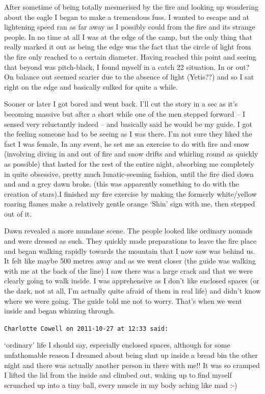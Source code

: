 \begin{footnotesize}
\begin{sffamily}
After sometime of being totally mesmerised by the fire and looking up wondering about the eagle I began to make a tremendous fuss. I wanted to escape and at lightening speed ran as far away as I possibly could from the fire and its strange people. In no time at all I was at the edge of the camp, but the only thing that really marked it out as being the edge was the fact that the circle of light from the fire only reached to a certain diameter. Having reached this point and seeing that beyond was pitch-black, I found myself in a catch 22 situation. In or out? On balance out seemed scarier due to the absence of light (Yetis??) and so I sat right on the edge and basically sulked for quite a while.

Sooner or later I got bored and went back. I'll cut the story in a sec as it's becoming massive but after a short while one of the men stepped forward -- I sensed very reluctantly indeed -- and basically said he would be my guide. I got the feeling someone had to be seeing as I was there. I'm not sure they liked the fact I was female, In any event, he set me an exercise to do with fire and snow (involving diving in and out of fire and snow drifts and whirling round as quickly as possible) that lasted for the rest of the entire night, absorbing me completely in quite obsessive, pretty much lunatic-seeming fashion, until the fire died down and and a grey dawn broke. (this was apparently something to do with the creation of stars).I finished my fire exercise by making the formerly white/yellow roaring flames make a relatively gentle orange `Shin' sign with me, then stepped out of it.

Dawn revealed a more mundane scene. The people looked like ordinary nomads and were dressed as such. They quickly made preparations to leave the fire place and began walking rapidly towards the mountain that I now saw was behind us. It felt like maybe 500 metres away and as we went closer (the guide was walking with me at the back of the line) I saw there was a large crack and that we were clearly going to walk inside. I was apprehensive as I don't like enclosed spaces (or the dark, not at all, I'm actually quite afraid of them in real life) and didn't know where we were going. The guide told me not to worry. That's when we went inside and began whizzing through.

\hfill

\texttt{Charlotte Cowell on 2011-10-27 at 12:33 said:}

`ordinary' life I should say, especially enclosed spaces, although for some unfathomable reason I dreamed about being shut up inside a bread bin the other night and there was actually another person in there with me!! It was so cramped I lifted the lid from the inside and climbed out, waking up to find myself scrunched up into a tiny ball, every muscle in my body aching like mad :-)


\end{sffamily}
\end{footnotesize}
